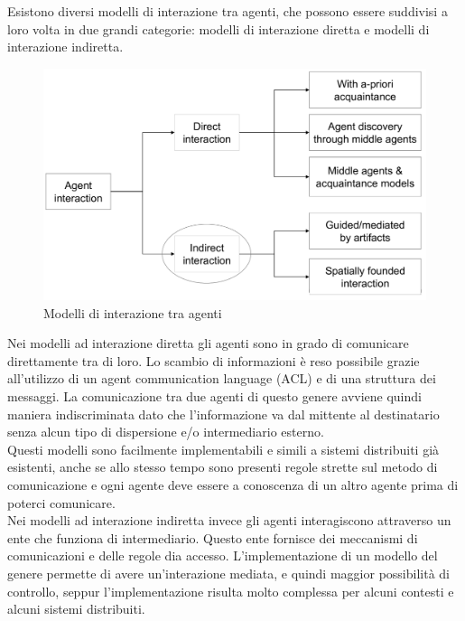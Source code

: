 \documentclass[12pt]{article}
\begin{document}
\noindent Esistono diversi modelli di interazione tra agenti, che possono essere suddivisi a loro volta in due grandi categorie: modelli di interazione diretta e modelli di interazione indiretta.

\begin{figure}[ht]
\centering
\includegraphics[width=\textwidth,height=\textheight,keepaspectratio]{Figures/Vario/Agent_Interaction.png}
\caption[Modelli di interazione tra agenti]{Modelli di interazione tra agenti}
\label{fig:Agent_Interaction}
\end{figure}

\noindent Nei modelli ad interazione diretta gli agenti sono in grado di comunicare direttamente tra di loro. Lo scambio di informazioni è reso possibile grazie all'utilizzo di un agent communication language (ACL) e di una struttura dei messaggi. La comunicazione tra due agenti di questo genere avviene quindi maniera indiscriminata dato che l'informazione va dal mittente al destinatario senza alcun tipo di dispersione e/o intermediario esterno. \\ Questi modelli sono facilmente implementabili e simili a sistemi distribuiti già esistenti, anche se allo stesso tempo sono presenti regole strette sul metodo di comunicazione e ogni agente deve essere a conoscenza di un altro agente prima di poterci comunicare.\\

\noindent Nei modelli ad interazione indiretta invece gli agenti interagiscono attraverso un ente che funziona di intermediario. Questo ente fornisce dei meccanismi di comunicazioni e delle regole dia accesso. L'implementazione di un modello del genere permette di avere un'interazione mediata, e quindi maggior possibilità di controllo, seppur l'implementazione risulta molto complessa per alcuni contesti e alcuni sistemi distribuiti.
\end{document}
